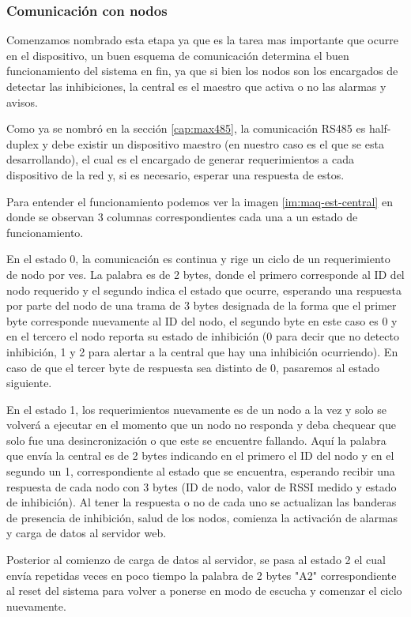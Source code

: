 \subsubsection{Comunicación con nodos}
\par Comenzamos nombrado esta etapa ya que es la tarea mas importante que ocurre en el dispositivo, un buen esquema de comunicación determina el buen funcionamiento del sistema en fin, ya que si bien los nodos son los encargados de detectar las inhibiciones, la central es el maestro que activa o no las alarmas y avisos. 
\par Como ya se nombró en la sección \ref{cap:max485}, la comunicación RS485 es half-duplex y debe existir un dispositivo maestro (en nuestro caso es el que se esta desarrollando), el cual es el encargado de generar requerimientos a cada dispositivo de la red y, si es necesario, esperar una respuesta de estos. 
\par Para entender el funcionamiento podemos ver la imagen \ref{im:maq-est-central} en donde se observan 3 columnas correspondientes cada una a un estado de funcionamiento.
\par En el estado 0, la comunicación es continua y rige un ciclo de un requerimiento de nodo por ves. La palabra es de 2 bytes, donde el primero corresponde al ID del nodo requerido y el segundo indica el estado que ocurre, esperando una respuesta por parte del nodo de una trama de 3 bytes designada de la forma que el primer byte corresponde nuevamente al ID del nodo, el segundo byte en este caso es 0 y en el tercero el nodo reporta su estado de inhibición (0 para decir que no detecto inhibición, 1 y 2 para alertar a la central que hay una inhibición ocurriendo). En caso de que el tercer byte de respuesta sea distinto de 0, pasaremos al estado siguiente.
\par En el estado 1, los requerimientos nuevamente es de un nodo a la vez y solo se volverá a ejecutar en el momento que un nodo no responda y deba chequear que solo fue una desincronización o que este se encuentre fallando. Aquí la palabra que envía la central es de 2 bytes indicando en el primero el ID del nodo y en el segundo un 1, correspondiente al estado que se encuentra, esperando recibir una respuesta de cada nodo con 3 bytes (ID de nodo, valor de RSSI medido y estado de inhibición). Al tener la respuesta o no de cada uno se actualizan las banderas de presencia de inhibición, salud de los nodos, comienza la activación de alarmas y carga de datos al servidor web. 
\par Posterior al comienzo de carga de datos al servidor, se pasa al estado 2 el cual envía repetidas veces en poco tiempo la palabra de 2 bytes "A2" correspondiente al reset del sistema para volver a ponerse en modo de escucha y comenzar el ciclo nuevamente. 

